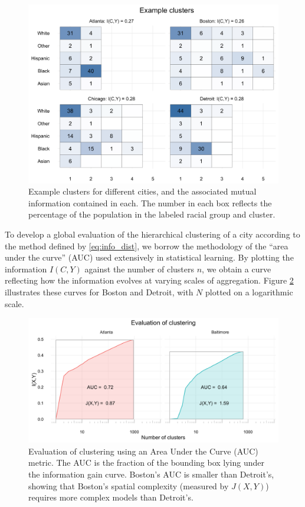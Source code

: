 		\begin{figure}
			\centering
			\includegraphics[width=\textwidth]{figs/example_clusters.png}
			\caption{Example clusters for different cities, and the associated mutual information contained in each. The number in each box reflects the percentage of the population in the labeled racial group and cluster. }
			\label{fig:clusters}
		\end{figure}		

		To develop a global evaluation of the hierarchical clustering of a city according to the method defined by \eqref{eq:info_dist}, we borrow the methodology of the ``area under the curve'' (AUC) used extensively in statistical learning. By plotting the information $I(C,Y)$ against the number of clusters $n$, we obtain a curve reflecting how the information evolves at varying scales of aggregation. Figure \ref{fig:AUC} illustrates these curves for Boston and Detroit, with $N$ plotted on a logarithmic scale.  

		\begin{figure}
			\centering
			\includegraphics[width=\textwidth]{figs/AUC_illustration.png}
			\caption{Evaluation of clustering using an Area Under the Curve (AUC) metric. The AUC is the fraction of the bounding box lying under the information gain curve. Boston's AUC is smaller than Detroit's, showing that Boston's spatial complexity (measured by $J(X,Y)$) requires more complex models than Detroit's.}
			\label{fig:AUC}
		\end{figure}

